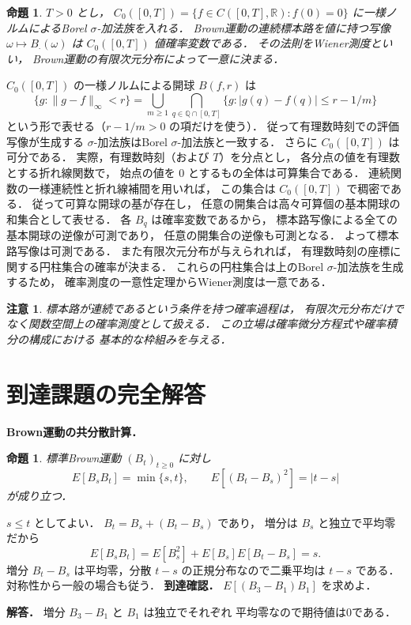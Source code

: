 \documentclass[a5paper,10pt,onecolumn]{jsarticle}
\makeatletter
\theoremstyle{mathnotetheorem}
\newtheorem{proposition}[theorem]{命題}
\newtheorem{remark}[theorem]{注意}
\renewcommand{\proofname}{証明}
\renewenvironment{proof}[1][\proofname]{%
  \par\pushQED{\qed}\normalfont\topsep4\p@\@plus2\p@\relax
  \trivlist\item[\hskip\labelsep\bfseries #1]\ignorespaces
}{\popQED\endtrivlist\@endpefalse}
\newcommand{\norm}[1]{\lVert #1\rVert}
\makeatother
\begin{document}
\begin{proposition}\label{prop:wiener}
$T>0$ とし，
$C_0([0,T])=\{f\in C([0,T],\mathbb R):f(0)=0\}$
に一様ノルムによるBorel $\sigma$-加法族を入れる．
Brown運動の連続標本路を値に持つ写像
$\omega\mapsto B_\cdot(\omega)$ は
$C_0([0,T])$ 値確率変数である．
その法則をWiener測度といい，
Brown運動の有限次元分布によって一意に決まる．
\end{proposition}
\begin{proof}
$C_0([0,T])$ の一様ノルムによる開球
$B(f,r)$ は
\[
 \{g:\norm{g-f}_\infty<r\}
 =\bigcup_{m\ge1}\bigcap_{q\in\mathbb Q\cap[0,T]}
  \{g:|g(q)-f(q)|\le r-1/m\}
\]
という形で表せる（$r-1/m>0$ の項だけを使う）．
従って有理数時刻での評価写像が生成する
$\sigma$-加法族はBorel $\sigma$-加法族と一致する．
さらに $C_0([0,T])$ は可分である．
実際，有理数時刻（および $T$）を分点とし，
各分点の値を有理数とする折れ線関数で，
始点の値を $0$ とするもの全体は可算集合である．
連続関数の一様連続性と折れ線補間を用いれば，
この集合は $C_0([0,T])$ で稠密である．
従って可算な開球の基が存在し，
任意の開集合は高々可算個の基本開球の和集合として表せる．
各 $B_q$ は確率変数であるから，
標本路写像による全ての基本開球の逆像が可測であり，
任意の開集合の逆像も可測となる．
よって標本路写像は可測である．
また有限次元分布が与えられれば，
有理数時刻の座標に関する円柱集合の確率が決まる．
これらの円柱集合は上のBorel $\sigma$-加法族を生成するため，
確率測度の一意性定理からWiener測度は一意である．
\end{proof}

\begin{remark}
標本路が連続であるという条件を持つ確率過程は，
有限次元分布だけでなく関数空間上の確率測度として扱える．
この立場は確率微分方程式や確率積分の構成における
基本的な枠組みを与える．
\end{remark}

\section{到達課題の完全解答}
\noindent\textbf{Brown運動の共分散計算．}
\begin{proposition}
標準Brown運動 $(B_t)_{t\ge0}$ に対し
\[
E[B_sB_t]=\min\{s,t\},\qquad
E[(B_t-B_s)^2]=|t-s|
\]
が成り立つ．
\end{proposition}
\begin{proof}
$s\le t$ としてよい．
$B_t=B_s+(B_t-B_s)$ であり，
増分は $B_s$ と独立で平均零だから
\[
E[B_sB_t]
=E[B_s^2]+E[B_s]E[B_t-B_s]
=s.
\]
増分 $B_t-B_s$ は平均零，分散 $t-s$
の正規分布なので二乗平均は $t-s$ である．
対称性から一般の場合も従う．
\end{proof}
\noindent\textbf{到達確認．}
$E[(B_3-B_1)B_1]$ を求めよ．
\par\noindent\textbf{解答．}
増分 $B_3-B_1$ と $B_1$ は独立でそれぞれ
平均零なので期待値は0である．
\end{document}
